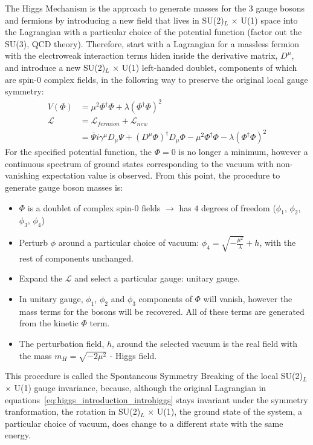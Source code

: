 The Higgs Mechanism is the approach to generate masses for the 3 gauge bosons and fermions by introducing a new field that lives in SU(2)$_L$ $\times$ U(1) space into the Lagrangian with a particular choice of the potential function (factor out the SU(3), QCD theory). Therefore, start with a Lagrangian for a massless fermion with the electroweak interaction terms hiden inside the derivative matrix, $D^{\mu}$, and introduce a new SU(2)$_L$ $\times$ U(1) left-handed doublet, components of which are spin-0 complex fields, in the following way to preserve the original local gauge symmetry:
\begin{subequations}\label{eq:higgs_introduction_introhiggs}
\begin{align}
    V(\Phi)& = \mu^2\Phi^{\dagger}\Phi + \lambda(\Phi^{\dagger}\Phi)^2\\
    \mathcal{L}& = \mathcal{L}_{fermion} + \mathcal{L}_{new}\\
    & = \bar{\Psi}i\gamma^{\mu}D_{\mu}\Psi + (D^{\mu}\Phi)^{\dagger}D_{\mu}\Phi - \mu^2\Phi^{\dagger}\Phi - \lambda(\Phi^{\dagger}\Phi)^2
\end{align}
\end{subequations}
For the specified potential function, the $\Phi = 0$ is no longer a minimum, however a continuous spectrum of ground states corresponding to the vacuum with non-vanishing expectation value is observed. From this point, the procedure to generate gauge boson masses is:
\begin{itemize}
    \item $\Phi$ is a doublet of complex spin-0 fields $\rightarrow$ has $4$ degrees of freedom ($\phi_1$, $\phi_2$, $\phi_3$, $\phi_4$)
    \item Perturb $\phi$ around a particular choice of vacuum: $\phi_4 = \sqrt{-\frac{\mu^2}{\lambda}} + h$, with the rest of components unchanged.
    \item Expand the $\mathcal{L}$ and select a particular gauge: unitary gauge.
    \item In unitary gauge, $\phi_1$, $\phi_2$ and $\phi_3$ components of $\Phi$ will vanish, however the mass terms for the bosons will be recovered. All of these terms are generated from the kinetic $\Phi$ term.
    \item The perturbation field, $h$, around the selected vacuum is the real field with the mass $m_H = \sqrt{-2\mu^2}$ - Higgs field.
\end{itemize}
This procedure is called the Spontaneous Symmetry Breaking of the local SU(2)$_L$ $\times$ U(1) gauge invariance, because, although the original Lagrangian in equations~\ref{eq:higgs_introduction_introhiggs} stays invariant under the symmetry tranformation, the rotation in SU(2)$_L$ $\times$ U(1), the ground state of the system, a particular choice of vacuum, does change to a different state with the same energy.

